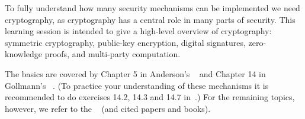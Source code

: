 To fully understand how many security mechanisms can be implemented we need 
cryptography, as cryptography has a central role in many parts of security.
This learning session is intended to give a high-level overview of 
cryptography: symmetric cryptography, public-key encryption, digital 
signatures, zero-knowledge proofs, and multi-party computation.

The basics are covered by
Chapter 5 in Anderson's ~\cite{Anderson2008sea} and
Chapter 14 in Gollmann's ~\cite{Gollmann2011cs}.
(To practice your understanding of these mechanisms it is recommended to do 
exercises 14.2, 14.3 and 14.7 in~\cite{Gollmann2011cs}.)
For the remaining topics, however, we refer to the ~\cite{EOCS} 
(and cited papers and books).
